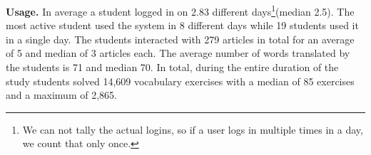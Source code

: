 {\bf Usage.}
In average a student logged in on 2.83 different days\footnote{We can not tally the actual logins, so if a user logs in multiple times in a day, we count that only once.}(median 2.5). The most active student used the system in 8 different days while 19 students used it in a single day. The students interacted with 279 articles in total for an average of 5 and median of 3 articles each. The average number of words translated by the students is 71 and median 70. In total, during the entire duration of the study students solved 14,609 vocabulary exercises with a median of 85 exercises and a maximum of 2,865.













